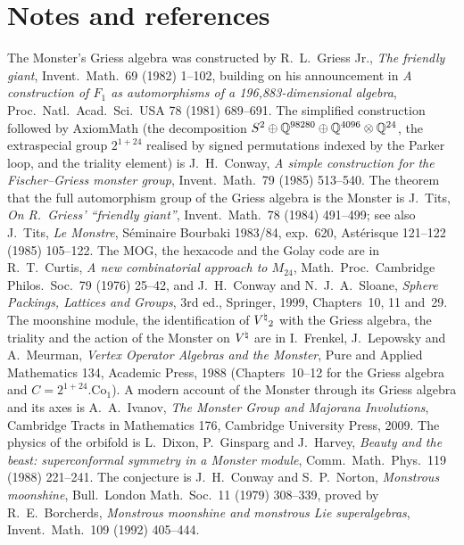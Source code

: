 \section{Notes and references}\label{ch21:sec:notes}

The Monster's Griess algebra was constructed by R.~L.~Griess Jr., \emph{The friendly giant}, Invent.\ Math.\
69 (1982) 1--102, building on his announcement in \emph{A construction of $F_1$ as automorphisms of a
196,883-dimensional algebra}, Proc.\ Natl.\ Acad.\ Sci.\ USA 78 (1981) 689--691.  The simplified construction
followed by AxiomMath (the decomposition $S^2\oplus{\mathbb{Q}}^{98280}\oplus{\mathbb{Q}}^{4096}\otimes{\mathbb{Q}}^{24}$, the extraspecial
group $2^{1+24}$ realised by signed permutations indexed by the Parker loop, and the triality element) is
J.~H.~Conway, \emph{A simple construction for the Fischer--Griess monster group}, Invent.\ Math.\ 79 (1985)
513--540.  The theorem that the full automorphism group of the Griess algebra is the Monster is J.~Tits,
\emph{On R.~Griess' ``friendly giant''}, Invent.\ Math.\ 78 (1984) 491--499; see also J.~Tits, \emph{Le Monstre},
S\'eminaire Bourbaki 1983/84, exp.\ 620, Ast\'erisque 121--122 (1985) 105--122.  The MOG, the hexacode and the
Golay code are in R.~T.~Curtis, \emph{A new combinatorial approach to $M_{24}$}, Math.\ Proc.\ Cambridge
Philos.\ Soc.\ 79 (1976) 25--42, and J.~H.~Conway and N.~J.~A.~Sloane, \emph{Sphere Packings, Lattices and
Groups}, 3rd ed., Springer, 1999, Chapters~10, 11 and~29.  The moonshine module, the identification of
${V^{\natural}}_2$ with the Griess algebra, the triality and the action of the Monster on ${V^{\natural}}$ are in I.~Frenkel,
J.~Lepowsky and A.~Meurman, \emph{Vertex Operator Algebras and the Monster}, Pure and Applied Mathematics 134,
Academic Press, 1988 (Chapters~10--12 for the Griess algebra and $C=2^{1+24}.\mathrm{Co}_1$).  A modern
account of the Monster through its Griess algebra and its axes is A.~A.~Ivanov, \emph{The Monster Group and
Majorana Involutions}, Cambridge Tracts in Mathematics 176, Cambridge University Press, 2009.  The physics
of the orbifold is L.~Dixon, P.~Ginsparg and J.~Harvey, \emph{Beauty and the beast: superconformal symmetry in
a Monster module}, Comm.\ Math.\ Phys.\ 119 (1988) 221--241.  The conjecture is J.~H.~Conway and S.~P.~Norton,
\emph{Monstrous moonshine}, Bull.\ London Math.\ Soc.\ 11 (1979) 308--339, proved by R.~E.~Borcherds,
\emph{Monstrous moonshine and monstrous Lie superalgebras}, Invent.\ Math.\ 109 (1992) 405--444.

